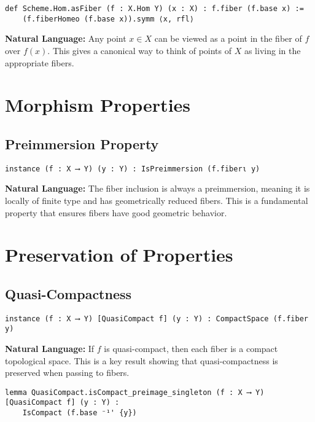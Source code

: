 \documentclass{article}
\theoremstyle{definition}
\begin{document}
\begin{lstlisting}
def Scheme.Hom.asFiber (f : X.Hom Y) (x : X) : f.fiber (f.base x) :=
    (f.fiberHomeo (f.base x)).symm ⟨x, rfl⟩
\end{lstlisting}

\textbf{Natural Language:} Any point $x \in X$ can be viewed as a point in the fiber of $f$ over $f(x)$. This gives a canonical way to think of points of $X$ as living in the appropriate fibers.

\section{Morphism Properties}

\subsection{Preimmersion Property}

\begin{lstlisting}
instance (f : X ⟶ Y) (y : Y) : IsPreimmersion (f.fiberι y)
\end{lstlisting}

\textbf{Natural Language:} The fiber inclusion is always a preimmersion, meaning it is locally of finite type and has geometrically reduced fibers. This is a fundamental property that ensures fibers have good geometric behavior.

\section{Preservation of Properties}

\subsection{Quasi-Compactness}

\begin{lstlisting}
instance (f : X ⟶ Y) [QuasiCompact f] (y : Y) : CompactSpace (f.fiber y)
\end{lstlisting}

\textbf{Natural Language:} If $f$ is quasi-compact, then each fiber is a compact topological space. This is a key result showing that quasi-compactness is preserved when passing to fibers.

\begin{lstlisting}
lemma QuasiCompact.isCompact_preimage_singleton (f : X ⟶ Y) [QuasiCompact f] (y : Y) :
    IsCompact (f.base ⁻¹' {y})
\end{lstlisting}
\end{document}
